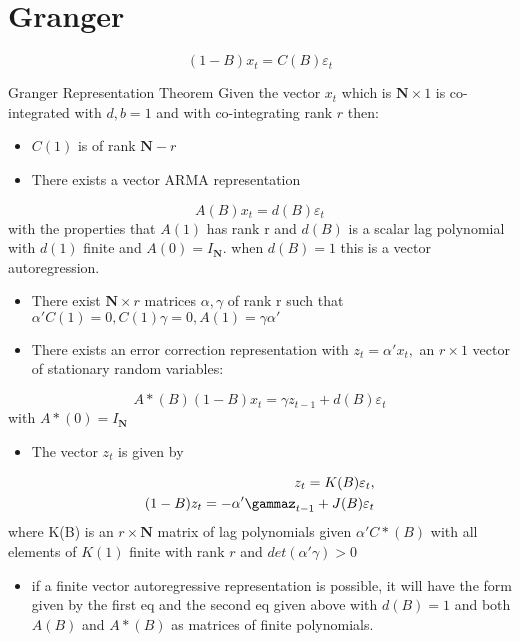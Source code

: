 \section{Granger}
\begin{equation*}
    (1-B)x_t=C(B)\varepsilon_t
\end{equation*}
\begin{thm}{Granger Representation Theorem}
    Given the vector $x_t$ which is $\mathbf{N} \times 1$ is co-integrated with $d,b=1$ and with co-integrating rank $r$ then:
    \begin{itemize}
        \item $C(1)$ is of rank $\mathbf{N}-r$
        \item There exists a vector ARMA representation
    \end{itemize}
    \begin{equation}
        A(B)x_t=d(B)\varepsilon_t
    \end{equation}
    with the properties that $A(1)$ has rank r and $d(B)$ is a scalar lag polynomial with $d(1)$ finite and $A(0)=I_\mathbf{N}$. when $d(B)=1$ this is a vector autoregression.
    \begin{itemize}
        \item There exist $\mathbf{N}\times r$ matrices $\alpha, \gamma$ of rank r such that $\alpha'C(1)=0,C(1)\gamma=0,A(1)=\gamma\alpha'$
        \item There exists an error correction representation with $z_t=\alpha'x_t,$ an $r\times1$ vector of stationary random variables:
    \end{itemize}
    \begin{equation}
        A*(B)(1-B)x_t=\gamma z_{t-1}+d(B)\varepsilon_t
    \end{equation}
    with $A*(0)=I_{\mathbf{N}}$
    \begin{itemize}
        \item The vector $z_t$ is given by 
    \end{itemize}
    \begin{align*}
        z_t=K(B)\varepsilon_t, \\
        (1-B)z_t=-\alpha'\gammaz_{t-1}+J(B)\varepsilon_t
    \end{align*}
    where K(B) is an $r\times \mathbf{N}$ matrix of lag polynomials given $\alpha'C*(B)$ with all elements of $K(1)$ finite with rank $r$ and $det(\alpha'\gamma)>0$
    \begin{itemize}
        \item if a finite vector autoregressive representation is possible, it will have the form given by the first eq and the second eq given above with $d(B)=1$ and both $A(B)$ and $A*(B)$ as matrices of finite polynomials.
    \end{itemize}
\end{thm}
